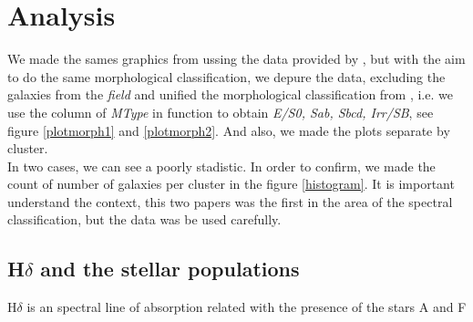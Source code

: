 \documentclass[fleqn,usenatbib]{mnras}
\begin{document}
\section{Analysis}
We made the sames graphics from \citet{Balogh} ussing the data provided by \citet{Dressler}, but with the aim to do the same morphological classification, we depure the data, excluding the galaxies from the \textit{field} and unified the morphological classification from \citet{Dressler}, i.e. we use the column of \textit{MType} in function to obtain \textit{E/S0, Sab, Sbcd, Irr/SB}, see figure \ref{plotmorph1} and \ref{plotmorph2}. And also, we made the plots separate by cluster. \\

In two cases, we can see a poorly stadistic. In order to confirm, we made the count of number of galaxies per cluster in the figure \ref{histogram}. It is important understand the context, this two papers was the first in the area of the spectral classification, but the data was be used carefully. \\

\subsection{H$\delta$ and the stellar populations}
H$\delta$ is an spectral line of absorption related with the presence of the stars A and F












\bsp	%
\label{lastpage}
\end{document}
